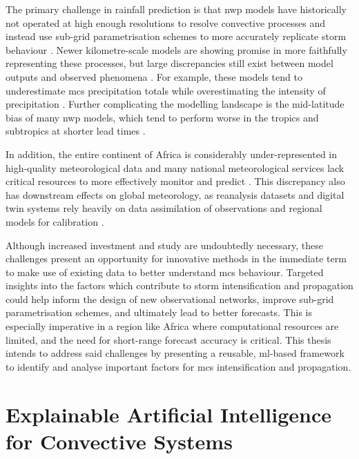 The primary challenge in rainfall prediction is that \acrfull{nwp} models have historically not operated at high enough resolutions to resolve convective processes and instead use sub-grid parametrisation schemes to more accurately replicate storm behaviour \citep{Stevens2019,Yano2018}. Newer kilometre-scale models are showing promise in more faithfully representing these processes, but large discrepancies still exist between model outputs and observed phenomena \citep{Feng2025,Yano2018}. For example, these models tend to underestimate \acrshort{mcs} precipitation totals while overestimating the intensity of precipitation \citep{Feng2025,Stevens2019}. Further complicating the modelling landscape is the mid-latitude bias of many \acrshort{nwp} models, which tend to perform worse in the tropics and subtropics at shorter lead times \citep{Keane2025}. 

In addition, the entire continent of Africa is considerably under-represented in high-quality meteorological data and many national meteorological services lack critical resources to more effectively monitor and predict  \citep{Dinku2019,Kinyondo2018,Meque2021}. This discrepancy also has downstream effects on global meteorology, as reanalysis datasets and digital twin systems rely heavily on data assimilation of observations and regional models for calibration \citep{Linsenmeier2023,Valmassoi2023}. 

Although increased investment and study are undoubtedly necessary, these challenges present an opportunity for innovative methods in the immediate term to make use of existing data to better understand \acrshort{mcs} behaviour. Targeted insights into the factors which contribute to storm intensification and propagation could help inform the design of new observational networks, improve sub-grid parametrisation schemes, and ultimately lead to better forecasts. This is especially imperative in a region like Africa where computational resources are limited, and the need for short-range forecast accuracy is critical. This thesis intends to address said challenges by presenting a reusable, \acrfull{ml}-based framework to identify and analyse important factors for \acrshort{mcs} intensification and propagation.

\section{Explainable Artificial Intelligence for Convective Systems}

